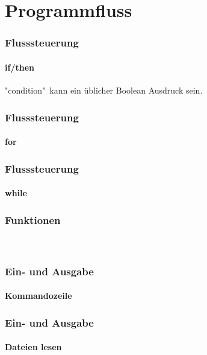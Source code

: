 \documentclass[12pt,ngerman]{beamer}
\begin{document}
\section{Programmfluss}

\begin{frame}[fragile]
\frametitle{Flusssteuerung}
\framesubtitle{if/then}



"condition"\ kann ein üblicher Boolean Ausdruck sein.

\end{frame}

\begin{frame}[fragile]
\frametitle{Flusssteuerung}
\framesubtitle{for}



\end{frame}

\begin{frame}[fragile]
\frametitle{Flusssteuerung}
\framesubtitle{while}



\end{frame}

\begin{frame}[fragile]
\frametitle{Funktionen}
\framesubtitle{~}



\end{frame}


\begin{frame}[fragile]
\frametitle{Ein- und Ausgabe}
\framesubtitle{Kommandozeile}



\end{frame}

\begin{frame}[fragile]
\frametitle{Ein- und Ausgabe}
\framesubtitle{Dateien lesen}

 

\end{frame}
\end{document}
